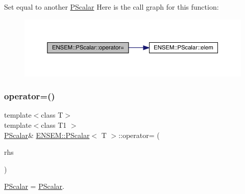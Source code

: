 Set equal to another \mbox{\hyperlink{classENSEM_1_1PScalar}{P\+Scalar}} Here is the call graph for this function\+:
\nopagebreak
\begin{figure}[H]
\begin{center}
\leavevmode
\includegraphics[width=350pt]{d3/d27/classENSEM_1_1PScalar_ae69d6f1ad8ec0b65652f8d16c5f97b11_cgraph}
\end{center}
\end{figure}
\mbox{\label{classENSEM_1_1PScalar_ae69d6f1ad8ec0b65652f8d16c5f97b11}} 
\subsubsection{\texorpdfstring{operator=()}{operator=()}\hspace{0.1cm}{\footnotesize\ttfamily [5/6]}}
{\footnotesize\ttfamily template$<$class T$>$ \\
template$<$class T1 $>$ \\
\mbox{\hyperlink{classENSEM_1_1PScalar}{P\+Scalar}}\& \mbox{\hyperlink{classENSEM_1_1PScalar}{E\+N\+S\+E\+M\+::\+P\+Scalar}}$<$ T $>$\+::operator= (\begin{DoxyParamCaption}\item[{const \mbox{\hyperlink{classENSEM_1_1PScalar}{P\+Scalar}}$<$ T1 $>$ \&}]{rhs }\end{DoxyParamCaption})\hspace{0.3cm}{\ttfamily [inline]}}



\mbox{\hyperlink{classENSEM_1_1PScalar}{P\+Scalar}} = \mbox{\hyperlink{classENSEM_1_1PScalar}{P\+Scalar}}. 

